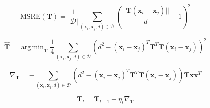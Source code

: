 \documentclass[a4paper,titlepage]{article}
\renewcommand{\vec}[1]{\mathbf{#1}}
\newcommand{\mat}[1]{\mathbf{#1}}
\DeclareMathOperator*{\argmin}{arg\,min}
\begin{document}
\begin{equation}
\text{MSRE}(\mat{T}) = \frac{1}{|\mathcal{D}|}\sum_{(\vec{x}_i, \vec{x}_j, d) \in \mathcal{D}} \left ( \frac{||\mat{T} (\vec{x}_i - \vec{x}_j)||}{d} - 1 \right)^2
\label{eq:msre}
\end{equation}

\begin{equation}
\hat{\mat{T}} = \argmin_{\mat{T}} \frac{1}{4} \sum_{(\vec{x}_i, \vec{x}_j, d) \in \mathcal{D}} \left ( d^2 - (\vec{x}_i - \vec{x}_j)^T \mat{T}^T \mat{T} (\vec{x}_i - \vec{x}_j) \right)^2
\label{eq:opt_target}
\end{equation}


\begin{equation}
\nabla_{\mat{T}}  = - \sum_{(\vec{x}_i, \vec{x}_j, d) \in \mathcal{D}} \left ( d^2 - (\vec{x}_i - \vec{x}_j)^T \mat{T}^T \mat{T} (\vec{x}_i - \vec{x}_j) \right) \mat{T} \vec{x} \vec{x}^T
\label{eq:opt_grad}
\end{equation}

\begin{equation}
\mat{T}_{t}  = \mat{T}_{t-1} - \eta_{t} \nabla_{\mat{T}}
\label{eq:opt_grad}
\end{equation}



\end{document}
